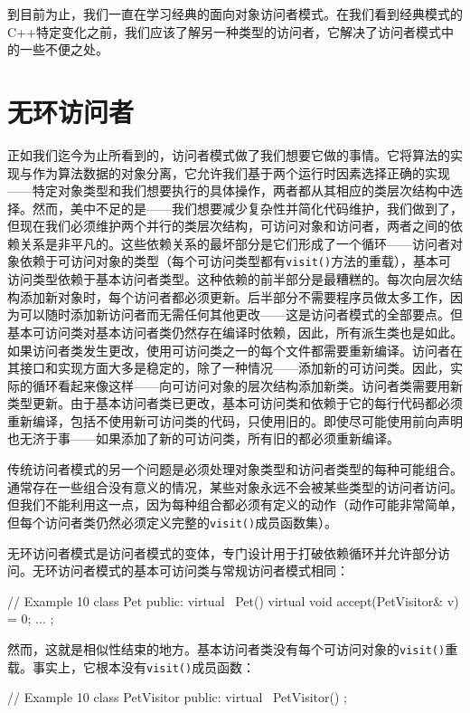 \begin{code}
{到目前为止，我们一直在学习经典的面向对象访问者模式。在我们看到经典模式的C++特定变化之前，我们应该了解另一种类型的访问者，它解决了访问者模式中的一些不便之处。

\section{无环访问者}

正如我们迄今为止所看到的，访问者模式做了我们想要它做的事情。它将算法的实现与作为算法数据的对象分离，它允许我们基于两个运行时因素选择正确的实现——特定对象类型和我们想要执行的具体操作，两者都从其相应的类层次结构中选择。然而，美中不足的是——我们想要减少复杂性并简化代码维护，我们做到了，但现在我们必须维护两个并行的类层次结构，可访问对象和访问者，两者之间的依赖关系是非平凡的。这些依赖关系的最坏部分是它们形成了一个循环——访问者对象依赖于可访问对象的类型（每个可访问类型都有\texttt{visit()}方法的重载），基本可访问类型依赖于基本访问者类型。这种依赖的前半部分是最糟糕的。每次向层次结构添加新对象时，每个访问者都必须更新。后半部分不需要程序员做太多工作，因为可以随时添加新访问者而无需任何其他更改——这是访问者模式的全部要点。但基本可访问类对基本访问者类仍然存在编译时依赖，因此，所有派生类也是如此。如果访问者类发生更改，使用可访问类之一的每个文件都需要重新编译。访问者在其接口和实现方面大多是稳定的，除了一种情况——添加新的可访问类。因此，实际的循环看起来像这样——向可访问对象的层次结构添加新类。访问者类需要用新类型更新。由于基本访问者类已更改，基本可访问类和依赖于它的每行代码都必须重新编译，包括不使用新可访问类的代码，只使用旧的。即使尽可能使用前向声明也无济于事——如果添加了新的可访问类，所有旧的都必须重新编译。

传统访问者模式的另一个问题是必须处理对象类型和访问者类型的每种可能组合。通常存在一些组合没有意义的情况，某些对象永远不会被某些类型的访问者访问。但我们不能利用这一点，因为每种组合都必须有定义的动作（动作可能非常简单，但每个访问者类仍然必须定义完整的\texttt{visit()}成员函数集）。

无环访问者模式是访问者模式的变体，专门设计用于打破依赖循环并允许部分访问。无环访问者模式的基本可访问类与常规访问者模式相同：

\begin{code}
// Example 10
class Pet {
  public:
  virtual ~Pet() {}
  virtual void accept(PetVisitor& v) = 0;
  ...
};
\end{code}

然而，这就是相似性结束的地方。基本访问者类没有每个可访问对象的\texttt{visit()}重载。事实上，它根本没有\texttt{visit()}成员函数：

\begin{code}
// Example 10
class PetVisitor {
  public:
  virtual ~PetVisitor() {}
};
\end{code}

}
\end{code}
